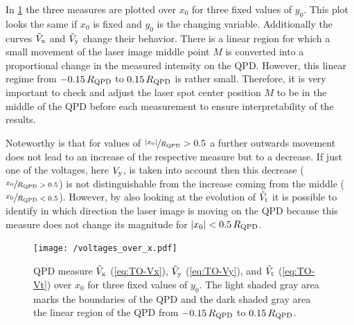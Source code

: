 In \cref{fig:TO-voltages_over_x} the three measures are plotted over $x_{0}$ 
for three fixed values of $y_{0}$. This plot looks the same if $x_{0}$ is fixed 
and $y_{0}$ is the changing variable. Additionally the curves 
$\tilde{V}_{\mathrm{x}}$ and $\tilde{V}_{\mathrm{y}}$ change their behavior. 
There is a linear region for which a small movement of the laser image middle 
point $M$ is converted into a proportional change in the measured intensity on 
the QPD. However, this linear regime from $-0.15\,R_{\mathrm{QPD}}$ to 
$0.15\,R_{\mathrm{QPD}}$ is rather small. Therefore, it is very important to check 
and adjust the laser spot center position $M$ to be in the middle of the QPD 
before each measurement to ensure interpretability of the results.

Noteworthy is that for values of $\sfrac{\abs{x_{0}}}{R_{\mathrm{QPD}}} > 0.5$ a 
further outwards movement does not lead to an increase of the respective 
measure but to a decrease. If just one of the voltages, here $V_{\mathrm{y}}$, is 
taken into account then this decrease ($\sfrac{x_{0}}{R_{\mathrm{QPD}} > 0.5}$) is 
not distinguishable from the increase coming from the middle 
($\sfrac{x_{0}}{R_{\mathrm{QPD}} < 0.5}$). However, by also looking at the 
evolution of $\tilde{V}_{\mathrm{t}}$ it is possible to identify in which 
direction the laser image is moving on the QPD because this measure does not 
change its magnitude for $\abs{x_{0}} < 0.5\,R_{\mathrm{QPD}} $.

\begin{figure}[tbp]
  \centering
  \texttt{[image: /voltages\_over\_x.pdf]}
  \caption{QPD measure $\tilde{V}_{\mathrm{x}}$ (\cref{eq:TO-Vx}), 
    $\tilde{V}_{\mathrm{y}}$
    (\cref{eq:TO-Vy}), and $\tilde{V}_{\mathrm{t}}$ (\cref{eq:TO-Vt}) over 
  $x_{0}$ for three fixed values of $y_{0}$. The light shaded gray area marks 
the boundaries of the QPD and the dark shaded gray area the linear region of 
the QPD from $-0.15\,R_{\mathrm{QPD}}$ to $0.15\,R_{\mathrm{QPD}}$.}
  \label{fig:TO-voltages_over_x}
\end{figure}
